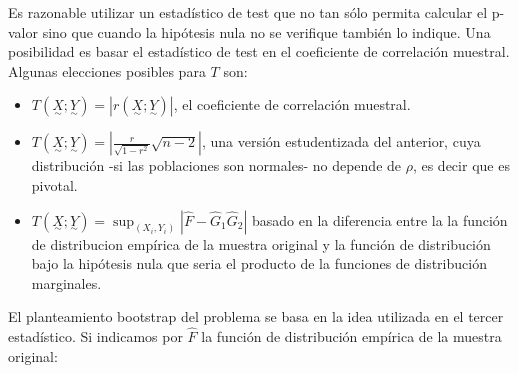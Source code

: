 \documentclass[
]{article}
\providecommand{\tightlist}{%
  \setlength{\itemsep}{0pt}\setlength{\parskip}{0pt}}
\begin{document}
Es razonable utilizar un estadístico de test que no tan sólo permita calcular el p-valor sino que cuando la hipótesis nula no se verifique también lo indique. Una posibilidad es basar el estadístico de test en el coeficiente de correlación muestral. Algunas elecciones posibles para \(T\) son:

\begin{itemize}
\tightlist
\item
  \(T(\underset{\sim}{X} ; \underset{\sim}{Y})=|r(\underset{\sim}{X} ; \underset{\sim}{Y})|\), el coeficiente de correlación muestral.
\item
  \(T(\underset{\sim}{X} ; \underset{\sim}{Y})=\left|\frac{r}{\sqrt{1-r^{2}}} \sqrt{n-2}\right|\), una versión estudentizada del anterior, cuya distribución -si las poblaciones son normales- no depende de \(\rho\), es decir que es pivotal.
\item
  \(T(\underset{\sim}{X} ; \underset{\sim}{Y})=\sup _{\left(X_{i}, Y_{i}\right)}\left|\hat{F}-\hat{G}_{1} \hat{G}_{2}\right|\) basado en la diferencia entre la la función de distribucion empírica de la muestra original y la función de distribución bajo la hipótesis nula que seria el producto de la funciones de distribución marginales.
\end{itemize}

El planteamiento bootstrap del problema se basa en la idea utilizada en el tercer estadístico. Si indicamos por \(\hat{F}\) la función de distribución empírica de la muestra original:
\end{document}
